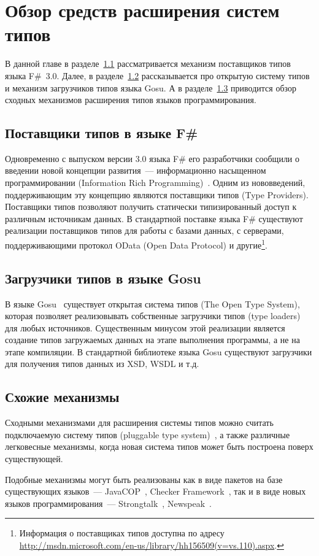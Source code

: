 \section{Обзор средств расширения систем типов}
В данной главе в разделе~\ref{f-sharp-type-providers} рассматривается механизм поставщиков типов языка F\#~3.0. Далее, в разделе~\ref{gosu-type-loaders} рассказывается про открытую систему типов и механизм загрузчиков типов языка Gosu. А в разделе~\ref{similar-mechanisms} приводится обзор сходных механизмов расширения типов языков программирования. 

\subsection{Поставщики типов в языке F\#}\label{f-sharp-type-providers}
Одновременно с выпуском версии 3.0 языка F\# его разработчики сообщили о введении новой концепции развития~--- информационно насыщенном программировании (Information Rich Programming)~\cite{joepamer2011}.
Одним из нововведений, поддерживающим эту концепцию являются поставщики типов (Type Providers).
Поставщики типов позволяют получить статически типизированный доступ к различным источникам данных.
В стандартной поставке языка F\# существуют реализации поставщиков типов для работы с базами данных, с серверами, поддерживающими протокол OData (Open Data Protocol) и другие\footnote{Информация о поставщиках типов доступна по адресу \url{http://msdn.microsoft.com/en-us/library/hh156509(v=vs.110).aspx}.}.

\subsection{Загрузчики типов в языке Gosu}\label{gosu-type-loaders}
В языке Gosu~\cite{gosuguide} существует открытая система типов (The Open Type System), которая позволяет реализовывать собственные загрузчики типов (type loaders) для любых источников.
Существенным минусом этой реализации является создание типов загружаемых данных на этапе выполнения программы, а не на этапе компиляции.
В стандартной библиотеке языка Gosu существуют загрузчики для получения типов данных из XSD, WSDL и т.д.

\subsection{Схожие механизмы}\label{similar-mechanisms}
Сходными механизмами для расширения системы типов можно считать подключаемую систему типов (pluggable type system)~\cite{bracha}, а также различные легковесные механизмы, когда новая система типов может быть построена поверх существующей.

Подобные механизмы могут быть реализованы как в виде пакетов на базе существующих языков~--- JavaCOP~\cite{javacop2010}, Checker Framework~\cite{checkerframework2008},
так и в виде новых языков программирования~--- Strongtalk~\cite{strongtalk1993}, Newspeak~\cite{newspeak2008}.
